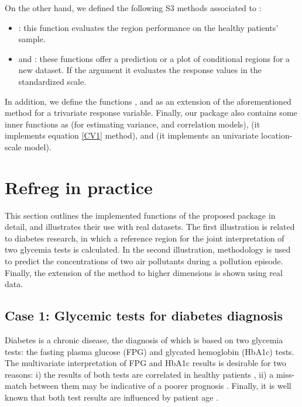 On the other hand, we defined the following S3 methods associated to :

\begin{itemize}
\item  {}: this function evaluates the region performance on the healthy patients' sample.
\item {} and : these functions offer a prediction or a plot of conditional regions for a new dataset. If the argument  it evaluates the response values in the standardized scale. 
\end{itemize}
	
In addition, we define the functions ,  and  as an extension of the aforementioned method for a trivariate response variable. Finally, our package also contains some inner functions as  (for estimating variance, and correlation models),  (it implements equation \eqref{CV1} method), and   (it implements an univariate location-scale model).

\section{Refreg in practice}

This section outlines the implemented functions of the proposed package in detail, and illustrates their use with real datasets. The first illustration is related to diabetes research, in which a reference region for the joint interpretation of two glycemia tests is calculated. In the second illustration,  methodology is used to predict the concentrations of two air pollutants during a pollution episode. Finally, the extension of the method to higher dimensions is shown using real data.

\subsection{Case 1: Glycemic tests for diabetes diagnosis}

Diabetes is a chronic disease, the diagnosis of which is based on two glycemia tests: the fasting plasma glucose (FPG) and glycated hemoglobin (HbA1c)\citep{american20192} tests. The multivariate interpretation of FPG and HbA1c results is desirable for two reasons: i) the results of both tests are correlated in healthy patients \citep{aleyassine1980glycosylated}, ii) a miss-match between them may be indicative of a poorer prognosis \citep{kim2018hemoglobin}. Finally, it is well known that both test results are influenced by patient age \citep{davidson1979effect,pani2008effect}. 

